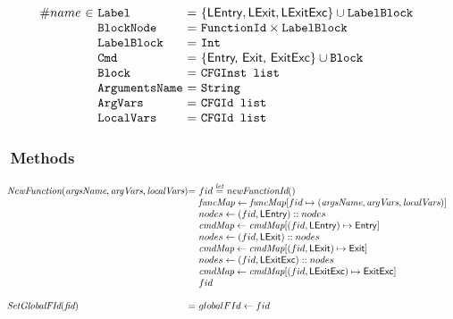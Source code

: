 \[\begin{array}{r@{~}l@{~}l@{}l@{~}l}
\#name&\in&\Label &=& \{\LEntry, \LExit, \LExitExc\} \cup \TT{LabelBlock}\\
&&\TT{BlockNode} &=& \FunctionId \times \TT{LabelBlock}\\
&&\TT{LabelBlock} &=& \TT{Int}\\
&&\TT{Cmd} &=& \{\SF{Entry, Exit, ExitExc}\} \cup \TT{Block}\\
&&\TT{Block} &=& \TT{CFGInst list}\\
&&\TT{ArgumentsName}\ & = & \TT{String}\\
&&\ArgVars &=& \TT{CFGId list}\\
&&\LocalVars &=& \TT{CFGId list}\\
\end{array}
\]

\subsubsection{\CFG\ Methods}
\[
\begin{array}{l@{}l@{~}l}
\emph{NewFunction}(\emph{argsName}, \emph{argVars}, \emph{localVars})
	& = & fid \letval \emph{newFunctionId}()\\
	& & \emph{funcMap} \leftarrow \emph{funcMap}[fid \mapsto (\emph{argsName}, \emph{argVars},\emph{localVars})]\\
	& & nodes \leftarrow (fid,\LEntry)::nodes\\
	& & \emph{cmdMap} \leftarrow \emph{cmdMap}[(fid,\LEntry) \mapsto \SF{Entry}]\\
	& & nodes \leftarrow (fid,\LExit)::nodes\\
	& & \emph{cmdMap} \leftarrow \emph{cmdMap}[(fid,\LExit) \mapsto \SF{Exit}]\\
	& & nodes \leftarrow (fid,\LExitExc)::nodes\\
	& & \emph{cmdMap} \leftarrow \emph{cmdMap}[(fid,\LExitExc) \mapsto \SF{ExitExc}]\\
	& & fid\\
	& & \\

\emph{SetGlobalFId}(\emph{fid})
   & = & globalFId \leftarrow fid \\

\end{array}
\]

